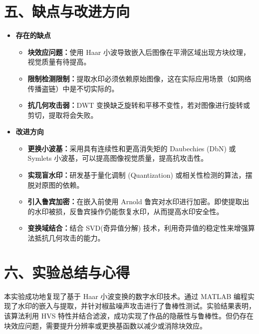 \documentclass[12pt, a4paper]{article}
\begin{document}
\section*{五、缺点与改进方向}
\begin{itemize}
    \item \textbf{存在的缺点}
    \begin{itemize} %
        \item \textbf{块效应问题：}使用 Haar 小波导致嵌入后图像在平滑区域出现方块纹理，视觉质量有待提高。
        \item \textbf{限制检测限制：}提取水印必须依赖原始图像，这在实际应用场景（如网络传播盗链）中是不切实际的。
        \item \textbf{抗几何攻击弱：}DWT 变换缺乏旋转和平移不变性，若对图像进行旋转或剪切，提取将会失败。
    \end{itemize}
    \item \textbf{改进方向}
    \begin{itemize} %
        \item \textbf{更换小波基：}采用具有连续性和更高消失矩的 Daubechies (DbN) 或 Symlets 小波基，可以提高图像视觉质量，提高抗攻击性。
        \item \textbf{实现盲水印：}研发基于量化调制 (Quantization) 或相关性检测的算法，摆脱对原图的依赖。
        \item \textbf{引入鲁宾加密：}在嵌入前使用 Arnold 鲁宾对水印进行加密。即使提取出的水印被损，反鲁宾操作仍能恢复水印，从而提高水印安全性。
        \item \textbf{变换域结合：}结合 SVD(奇异值分解) 技术，利用奇异值的稳定性来增强算法抵抗几何攻击的能力。
    \end{itemize}
\end{itemize}

\section*{六、实验总结与心得}
本实验成功地复现了基于 Haar 小波变换的数字水印技术。通过 MATLAB 编程实现了水印的嵌入与提取，并针对椒盐噪声攻击进行了鲁棒性测试。实验结果表明，该算法利用 HVS 特性并结合滤波，成功实现了作品的隐蔽性与鲁棒性。但仍存在块效应问题，需要提升分辨率或更换基函数以减少或消除块效应。

\end{document}

